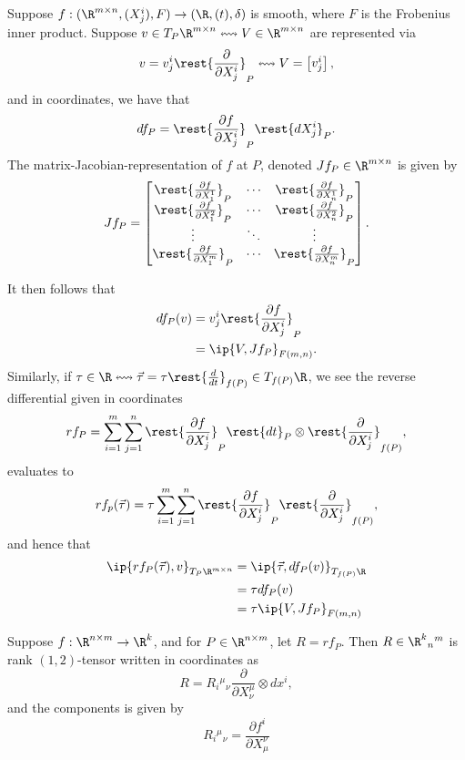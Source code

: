 
\begin{ex}
	Suppose $f:(\R^{m\times n}, (X^i_j), F)\to(\R, (t), \delta)$ is smooth, where $F$ is the Frobenius inner product.  Suppose $v\in T_P\R^{m\times n}\leftrightsquigarrow V\in\R^{m\times n}$ are represented via
	$$v=v^i_j\rest{\frac{\partial}{\partial X^i_j}}_P\leftrightsquigarrow V=\begin{bmatrix}
		v^i_j
	\end{bmatrix},$$
	and in coordinates, we have that
	$$df_P=\rest{\frac{\partial f}{\partial X^i_j}}_P\rest{dX^i_j}_P.$$
	The matrix-Jacobian-representation of $f$ at $P$, denoted $Jf_P\in\R^{m\times n}$ is given by
	$$Jf_P=\begin{bmatrix}
		\rest{\frac{\partial f}{\partial X^1_1}}_P&\cdots &\rest{\frac{\partial f}{\partial X^1_n}}_P\\
		\rest{\frac{\partial f}{\partial X^2_1}}_P&\cdots&\rest{\frac{\partial f}{\partial X^2_n}}_P\\
		\vdots&\ddots&\vdots\\
		\rest{\frac{\partial f}{\partial X^m_1}}_P&\cdots&\rest{\frac{\partial f}{\partial X^m_n}}_P
	\end{bmatrix}.$$
	
	It then follows that
	\begin{align*}
		df_P(v)&=v^i_j\rest{\frac{\partial f}{\partial X^i_j}}_P\\
		&=\ip{V,Jf_P}_{F(m,n)}.
	\end{align*}
	Similarly, if $\tau\in\R\leftrightsquigarrow\vec{\tau}=\tau\rest{\frac{d}{dt}}_{f(P)}\in T_{f(P)}\R$, we see the reverse differential given in coordinates
	$$rf_P=\sum_{i=1}^m\sum_{j=1}^n\rest{\frac{\partial f}{\partial X^i_j}}_P\rest{dt}_P\otimes\rest{\frac{\partial}{\partial X^i_j}}_{f(P)},$$
	evaluates to
	$$rf_p(\vec{\tau})=\tau\sum_{i=1}^m\sum_{j=1}^n\rest{\frac{\partial f}{\partial X^i_j}}_P\rest{\frac{\partial}{\partial X^i_j}}_{f(P)},$$
	and hence that
	\begin{align*}
		\ip{rf_P(\vec{\tau}),v}_{T_P\R^{m\times n}}&=\ip{\vec{\tau},df_P(v)}_{T_{f(P)}\R}\\
		&=\tau df_P(v)\\
		&=\tau\ip{V, Jf_P}_{F(m,n)}
	\end{align*}
\end{ex}






\begin{lem}
	Suppose $f:\R^{n\times m}\to\R^k$, and for $P\in\R^{n\times m}$, let $R=rf_P$.  Then $R\in\R^k{_n}{^m}$ is rank $(1,2)$-tensor written in coordinates as
	$$R=R_i{^\mu}{_\nu}\frac{\partial}{\partial X^\mu_\nu}\otimes dx^i,$$
	and the components is given by
	$$R_i{^\mu}{_\nu}=\frac{\partial f^i}{\partial X^\nu_\mu}$$
\end{lem}


